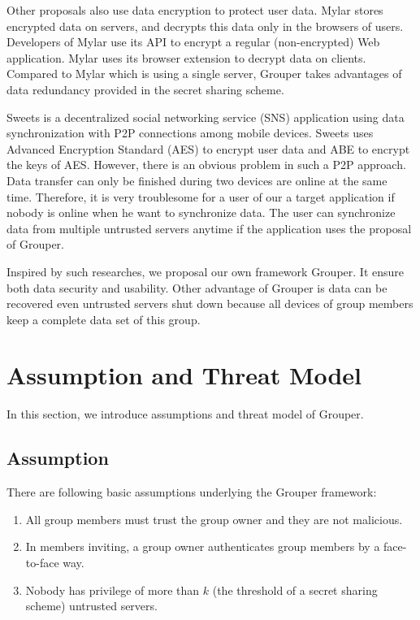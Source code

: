 \documentclass[twocolumn,10pt]{article}
\begin{document}
Other proposals also use data encryption to protect user data.
Mylar\cite{popa2014building} stores encrypted data on servers, and decrypts this data only in the browsers of users. 
Developers of Mylar use its API to encrypt a regular (non-encrypted) Web application. 
Mylar uses its browser extension to decrypt data on clients. 
Compared to Mylar which is using a single server, Grouper takes advantages of data redundancy provided in the secret sharing scheme.

Sweets\cite{sweets} is a decentralized social networking service (SNS) application using data synchronization with P2P connections among mobile devices. 
Sweets uses Advanced Encryption Standard (AES) to encrypt user data and ABE to encrypt the keys of AES. 
However, there is an obvious problem in such a P2P approach. 
Data transfer can only be finished during two devices are online at the same time. 
Therefore, it is very troublesome for a user of our a target application if nobody is online when he want to synchronize data.
The user can synchronize data from multiple untrusted servers anytime if the application uses the proposal of Grouper.

Inspired by such researches, we proposal our own framework Grouper.
It ensure both data security and usability.
Other advantage of Grouper is data can be recovered even untrusted servers shut down because all devices of group members keep a complete data set of this group.

\section{Assumption and Threat Model}

In this section, we introduce assumptions and threat model of Grouper.

\subsection{Assumption}

There are following basic assumptions underlying the Grouper framework:

\begin{enumerate}
	\setlength{\itemsep}{1pt}
	\setlength{\parskip}{0pt}
	\setlength{\parsep}{0pt}
	\item All group members must trust the group owner and they are not malicious.
	\item In members inviting, a group owner authenticates group members by a face-to-face way.
	\item Nobody has privilege of more than $k$ (the threshold of a secret sharing scheme) untrusted servers.
\end{enumerate}
\end{document}
